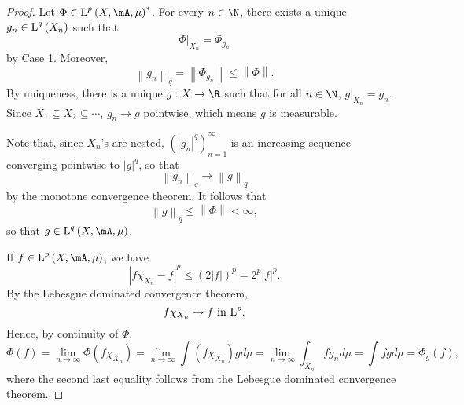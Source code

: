 \documentclass[pmath451]{subfiles}
\begin{document}
\begin{proof}
        Let $\Phi\in\LLL^p\left( X,\mA,\mu \right)^{*}$. For every $n\in\N$, there exists a unique $g_n\in\operatorname{L}^q\left( X_n \right)$ such that
        \begin{equation*}
            \Phi|_{X_n} = \Phi_{g_n}
        \end{equation*}
        by Case 1. Moreover,
        \begin{equation*}
            \left\lVert g_n\right\rVert_q = \left\lVert \Phi_{g_n}\right\rVert\leq\left\lVert \Phi\right\rVert.
        \end{equation*}
        By uniqueness, there is a unique $g:X\to\R$ such that for all $n\in\N$, $g|_{X_n} = g_n$. Since $X_1\subseteq X_2\subseteq\cdots$, $g_n\to g$ pointwise, which means $g$ is measurable.

        Note that, since $X_n$'s are nested, $\left( \left| g_n \right|^{q} \right)^{\infty}_{n=1}$ is an increasing sequence converging pointwise to $\left| g \right|^q$, so that
        \begin{equation*}
            \left\lVert g_n\right\rVert_q \to \left\lVert g\right\rVert_q
        \end{equation*}
        by the monotone convergence theorem. It follows that
        \begin{equation*}
            \left\lVert g\right\rVert_q \leq \left\lVert \Phi\right\rVert < \infty,
        \end{equation*}
        so that $g\in\LLL^q\left( X,\mA,\mu \right)$.

        If $f\in\LLL^p\left( X,\mA,\mu \right)$, we have
        \begin{equation*}
            \left| f\chi_{X_n}-f \right|^p \leq \left( 2\left| f \right| \right)^p = 2^p\left| f \right|^p.
        \end{equation*}
        By the Lebesgue dominated convergence theorem, 
        \begin{equation*}
            f\chi_{X_n}\to f\text{ in $\operatorname{L}^p$}.
        \end{equation*}
        Hence, by continuity of $\Phi$, 
        \begin{equation*}
            \Phi\left( f \right) = \lim_{n\to\infty}\Phi\left( f\chi_{X_n} \right) = \lim_{n\to\infty} \int \left( f\chi_{X_n} \right)gd\mu = \lim_{n\to\infty} \int_{X_n}fg_{n}d\mu = \int fgd\mu = \Phi_g\left( f \right),
        \end{equation*}
        where the second last equality follows from the Lebesgue dominated convergence theorem.
    \end{proof}
\end{document}
